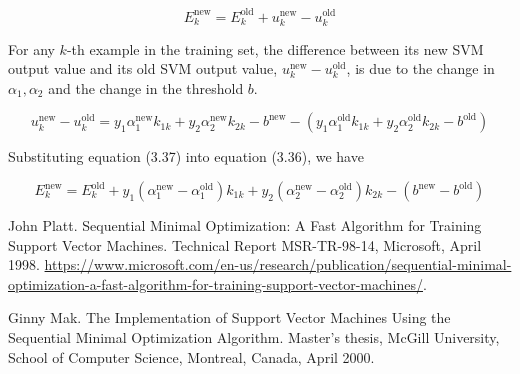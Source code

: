 \documentclass[10pt,a4paper]{article}
\begin{document}
\begin{equation}
	E_k^{\text{new}} = E_k^{\text{old}} + u_k^{\text{new}} - u_k^{\text{old}} \tag{3.37}
\end{equation}

For any \( k \)-th example in the training set, the difference between its new SVM output value and its old SVM output
value, \( u_k^{\text{new}} - u_k^{\text{old}} \), is due to the change in \( \alpha_1, \alpha_2 \) and the change in the threshold \( b \).

\begin{equation}
	u_k^{\text{new}} - u_k^{\text{old}} = y_1 \alpha_1^{\text{new}} k_{1k} + y_2 \alpha_2^{\text{new}} k_{2k} - b^{\text{new}} 
	- \left( y_1 \alpha_1^{\text{old}} k_{1k} + y_2 \alpha_2^{\text{old}} k_{2k} - b^{\text{old}} \right) \tag{3.38}
\end{equation}

Substituting equation (3.37) into equation (3.36), we have

\begin{equation}
	E_k^{\text{new}} = E_k^{\text{old}} + y_1 \left( \alpha_1^{\text{new}} - \alpha_1^{\text{old}} \right) k_{1k} 
	+ y_2 \left( \alpha_2^{\text{new}} - \alpha_2^{\text{old}} \right) k_{2k} - (b^{\text{new}} - b^{\text{old}}) \tag{3.39}
\end{equation}

 
\begin{thebibliography}{1}
	
	John Platt.
	\newblock Sequential Minimal Optimization: A Fast Algorithm for Training Support Vector Machines.
	\newblock Technical Report MSR-TR-98-14, Microsoft, April 1998.
	\newblock \url{https://www.microsoft.com/en-us/research/publication/sequential-minimal-optimization-a-fast-algorithm-for-training-support-vector-machines/}.
	
	Ginny Mak.
	\newblock The Implementation of Support Vector Machines Using the Sequential Minimal Optimization Algorithm.
	\newblock Master's thesis, McGill University, School of Computer Science, Montreal, Canada, April 2000.
	
\end{thebibliography}
\end{document}
